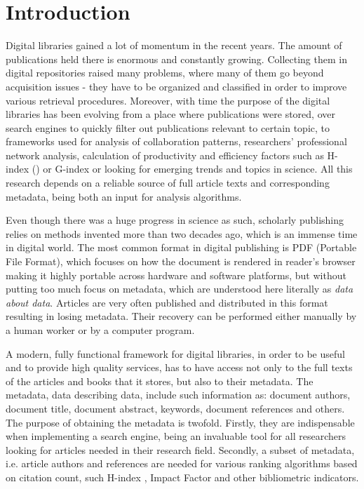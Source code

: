 \chapter{Introduction}
Digital libraries gained a lot of momentum in the recent years. The amount of publications held there is enormous and constantly growing. Collecting them in digital repositories raised many problems, where many of them go beyond acquisition issues - they have to be organized and classified in order to improve various retrieval procedures. Moreover, with time the purpose of the digital libraries has been evolving from a place where publications were stored, over search engines to quickly filter out publications relevant to certain topic, to frameworks used for analysis of collaboration patterns, researchers' professional network analysis, calculation of productivity and efficiency factors such as H-index (\cite{Hirsch}) or G-index or looking for emerging trends and topics in science.
All this research depends on a reliable source of full article texts and corresponding metadata, being both an input for analysis algorithms.

Even though there was a huge progress in science as such, scholarly publishing relies on methods invented more than two decades ago, which is an immense time in digital world. The most common format in digital publishing is PDF (Portable File Format), which focuses on how the document is rendered in reader's browser making it highly portable across hardware and software platforms, but without putting too much focus on metadata, which are understood here literally as \textit{data about data}. Articles are very often published and distributed in this format resulting in losing metadata. Their recovery can be performed either manually by a human worker or by a computer program. 

A modern, fully functional framework for digital libraries, in order to be useful and to provide high quality services, has to have access not only to the full texts of the articles and books that it stores, but also to their metadata. The metadata, data describing data, include such information as: document authors, document title, document abstract, keywords, document references and others. The purpose of obtaining the metadata is twofold. Firstly, they are indispensable when implementing a search engine, being an invaluable tool for all researchers looking for articles needed in their research field. Secondly, a subset of metadata, i.e. article authors and references are needed for various ranking algorithms based on citation count, such H-index \cite{Hirsch}, Impact Factor and other bibliometric indicators.

